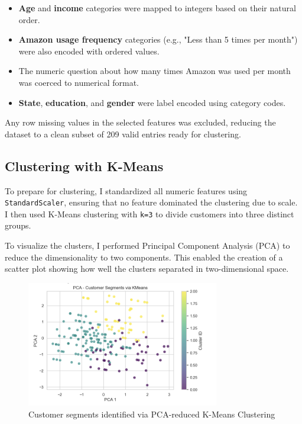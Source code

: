 \documentclass[12pt]{article}
\begin{document}
\begin{itemize}
    \item \textbf{Age} and \textbf{income} categories were mapped to integers based on their natural order.
    \item \textbf{Amazon usage frequency} categories (e.g., "Less than 5 times per month") were also encoded with ordered values.
    \item The numeric question about how many times Amazon was used per month was coerced to numerical format.
    \item \textbf{State}, \textbf{education}, and \textbf{gender} were label encoded using category codes.
\end{itemize}

Any row missing values in the selected features was excluded, reducing the dataset to a clean subset of 209 valid entries ready for clustering.

\subsection*{Clustering with K-Means}
To prepare for clustering, I standardized all numeric features using \texttt{StandardScaler}, ensuring that no feature dominated the clustering due to scale. I then used K-Means clustering with \texttt{k=3} to divide customers into three distinct groups.

To visualize the clusters, I performed Principal Component Analysis (PCA) to reduce the dimensionality to two components. This enabled the creation of a scatter plot showing how well the clusters separated in two-dimensional space.

\begin{figure}[h!]
  \centering
  \includegraphics[width=0.75\textwidth]{pca customer segments via kmeans.png}
  \caption{Customer segments identified via PCA-reduced K-Means Clustering}
  \label{fig:pca-clusters}
\end{figure}
\end{document}
